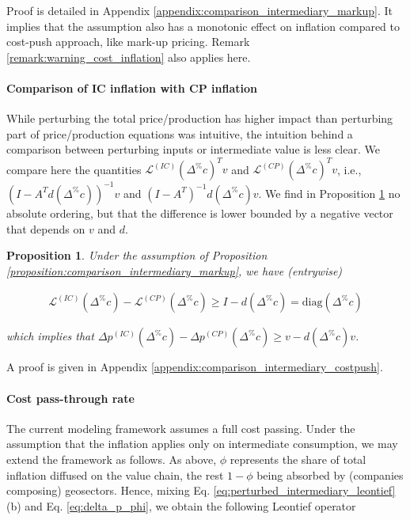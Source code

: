 \documentclass{article}
\newtheorem{proposition}{Proposition}
\begin{document}
\noindent Proof is detailed in Appendix \ref{appendix:comparison_intermediary_markup}. It implies that the assumption also has a monotonic effect on inflation compared to cost-push approach, like mark-up pricing. Remark \ref{remark:warning_cost_inflation} also applies here. 

\paragraph{Comparison of IC inflation with CP inflation}
While perturbing the total price/production has higher impact than perturbing part of price/production equations was intuitive, the intuition behind a comparison between perturbing inputs or intermediate value is less clear. We compare here the quantities ${\mathcal{L}^{(IC)}}(\Delta^\% c)^T v$ and ${\mathcal{L}^{(CP)}}(\Delta^\% c)^T v$, i.e., $\left( I - A^T d(\Delta^\% c) \right)^{-1}v$ and $(I-A^T)^{-1} d(\Delta^\% c) v$. We find in Proposition \ref{proposition:comparison_intermediary_costpush} no absolute ordering, but that the difference is lower bounded by a negative vector that depends on $v$ and $d$. 

\begin{proposition}
\label{proposition:comparison_intermediary_costpush}
    Under the assumption of Proposition \ref{proposition:comparison_intermediary_markup}, we have (entrywise)

    \begin{align}
        {\mathcal{L}^{(IC)}} (\Delta^\% c)- {\mathcal{L}^{(CP)}}(\Delta^\% c) \geq I - d(\Delta^\% c) = \text{diag} ( \Delta^\% c )
    \end{align}

    \noindent which implies that $\Delta p^{(IC)}(\Delta^\% c) - \Delta p^{(CP)}(\Delta^\% c) \geq v - d(\Delta^\% c)v$. 
\end{proposition}

\noindent A proof is given in Appendix \ref{appendix:comparison_intermediary_costpush}. 

\vspace{0.1cm}


\paragraph{Cost pass-through rate} The current modeling framework assumes a full cost passing. Under the assumption that the inflation applies only on intermediate consumption, we may extend the framework as follows. As above, $\phi$ represents the share of total inflation diffused on the value chain, the rest $1 - \phi$ being absorbed by (companies composing) geosectors. Hence, mixing Eq. \eqref{eq:perturbed_intermediary_leontief}(b) and Eq. \eqref{eq:delta_p_phi}, we obtain the following Leontief operator
\end{document}
